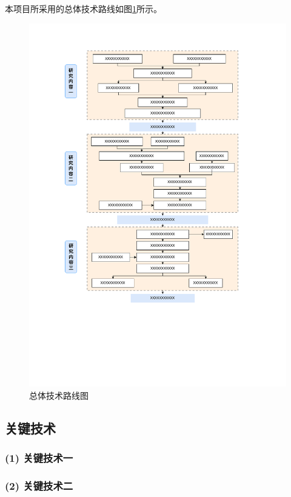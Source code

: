 \documentclass[UTF8,12pt,AutoFakeBold=2]{ctexart}
\begin{document}
本项目所采用的总体技术路线如图\ref{fig:roadmap}所示。
\begin{figure}[htbp]
	\centering
	\includegraphics[width=0.95\columnwidth]{figures/roadmap.pdf}
	\caption{总体技术路线图\label{fig:roadmap}}
\end{figure}


\subsection{关键技术}

\subsubsection*{(1) 关键技术一}

\subsubsection*{(2) 关键技术二}
\end{document}
